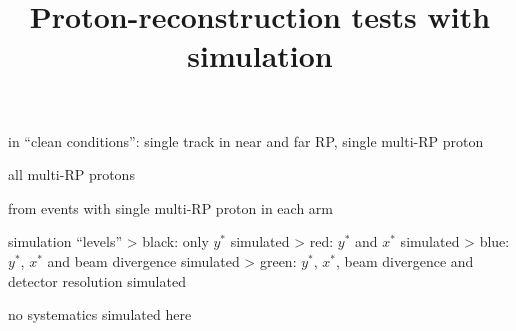 \centerline{}



\newpage %

\SmallerFonts

\> in ``clean conditions'': single track in near and far RP, single multi-RP proton

\centerline{}



\newpage %

\SmallerFonts

\> all multi-RP protons

\centerline{}



\newpage %

\SmallerFonts

\> from events with single multi-RP proton in each arm

\centerline{}



\newpage %
\title{Proton-reconstruction tests with simulation}

\> simulation ``levels''
\>> black: only $y^*$ simulated
\>> red: $y^*$ and $x^*$ simulated
\>> blue: $y^*$, $x^*$ and beam divergence simulated
\>> green: $y^*$, $x^*$, beam divergence and detector resolution simulated

\vfil
\> no systematics simulated here


\newpage %

\centerline{}


\newpage %

